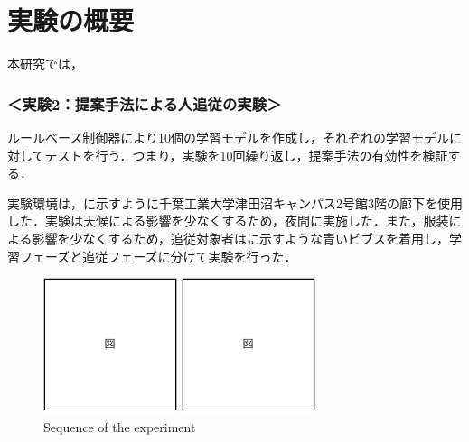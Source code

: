 
\section{実験の概要}

  本研究では，
  
\newpage

  \subsubsection*{＜実験2：提案手法による人追従の実験＞}
  ルールベース制御器により10個の学習モデルを作成し，それぞれの学習モデルに対してテストを行う．つまり，実験を10回繰り返し，提案手法の有効性を検証する．

  \vspace{1cm}

  実験環境は，に示すように千葉工業大学津田沼キャンパス2号館3階の廊下を使用した．実験は天候による影響を少なくするため，夜間に実施した．また，服装による影響を少なくするため，追従対象者はに示すような青いビブスを着用し，学習フェーズと追従フェーズに分けて実験を行った．



  \begin{figure}[h]
    \centering
    \begin{minipage}[c]{65mm} 
        \centering
        \includegraphics[height=40mm]{images/pdf/figure}
    \end{minipage}
    \begin{minipage}[c]{65mm} 
        \centering
        \includegraphics[height=40mm]{images/pdf/figure}
    \end{minipage}
    \caption{Sequence of the experiment}
    \label{Fig:Sequence of the experiment}
  \end{figure}

\newpage
